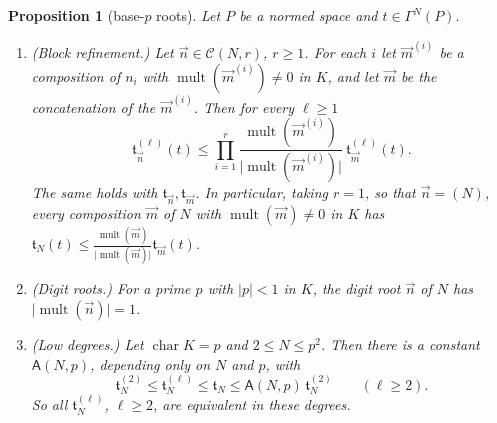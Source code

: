 \documentclass[11pt]{amsart}
\newtheorem{proposition}[theorem]{Proposition}
\theoremstyle{definition}
\theoremstyle{remark}
\numberwithin{equation}{section}
\newcommand{\abs}[1]{\lvert #1\rvert}
\theoremstyle{plain}
\theoremstyle{definition}
\theoremstyle{plain}
\begin{document}
\begin{proposition}[base-$p$ roots]\label{dp:prop:base-p}
Let $P$ be a normed space and $t\in\Gamma^N(P)$.
\begin{enumerate}
\item \textup{(Block refinement.)} Let $\vec n\in\mathcal C(N,r)$, $r\ge1$. For each $i$ let $\vec m^{(i)}$ be a composition of $n_i$ with $\operatorname{mult}(\vec m^{(i)})\ne0$ in $K$, and let $\vec m$ be the concatenation of the $\vec m^{(i)}$. Then for every $\ell\ge1$
\[
 \mathfrak t^{(\ell)}_{\vec n}(t)\le\prod_{i=1}^r\frac{\operatorname{mult}(\vec m^{(i)})}{\abs{\operatorname{mult}(\vec m^{(i)})}}\ \mathfrak t^{(\ell)}_{\vec m}(t).
\]
The same holds with $\mathfrak t_{\vec n},\mathfrak t_{\vec m}$. In particular, taking $r=1$, so that $\vec n=(N)$, every composition $\vec m$ of $N$ with $\operatorname{mult}(\vec m)\ne0$ in $K$ has $\mathfrak t_N(t)\le\frac{\operatorname{mult}(\vec m)}{\abs{\operatorname{mult}(\vec m)}}\mathfrak t_{\vec m}(t)$.
\item \textup{(Digit roots.)} For a prime $p$ with $\abs p<1$ in $K$, the digit root $\vec n$ of $N$ has $\abs{\operatorname{mult}(\vec n)}=1$.
\item \textup{(Low degrees.)} Let $\operatorname{char}K=p$ and $2\le N\le p^2$. Then there is a constant $\mathsf A(N,p)$, depending only on $N$ and $p$, with
\[
 \mathfrak t^{(2)}_N\le\mathfrak t^{(\ell)}_N\le\mathfrak t_N\le\mathsf A(N,p)\,\mathfrak t^{(2)}_N\qquad(\ell\ge2).
\]
So all $\mathfrak t^{(\ell)}_N$, $\ell\ge2$, are equivalent in these degrees.
\end{enumerate}
\end{proposition}
\end{document}
